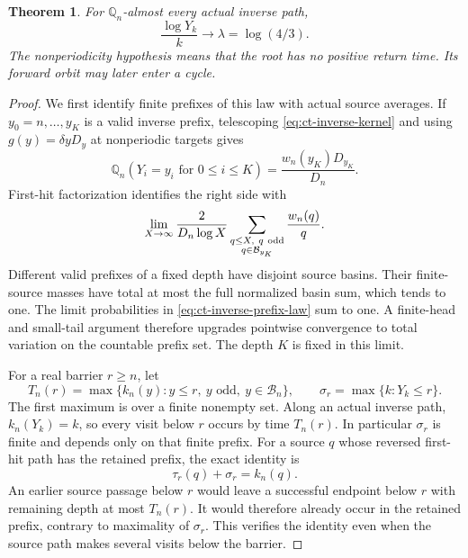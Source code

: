 \documentclass[11pt,a4paper]{article}
\newtheorem{theorem}{Theorem}
\begin{document}
\begin{theorem}\label{thm:ct-inverse-height-clock}
For \(\mathbb Q_n\)-almost every actual inverse path,
\begin{equation}\label{eq:ct-inverse-height-clock}
 \frac{\log Y_k}{k}\longrightarrow\lambda=\log(4/3).
\end{equation}
The nonperiodicity hypothesis means that the root has no positive
return time. Its forward orbit may later enter a cycle.
\end{theorem}
\begin{proof}
We first identify finite prefixes of this law with actual source
averages. If \(y_0=n,\ldots,y_K\) is a valid inverse prefix,
telescoping \eqref{eq:ct-inverse-kernel} and using
\(g(y)=\delta yD_y\) at nonperiodic targets gives
\begin{equation}\label{eq:ct-inverse-prefix-law}
 \mathbb Q_n(Y_i=y_i\text{ for }0\le i\le K)
       =\frac{w_n(y_K)D_{y_K}}{D_n}.
\end{equation}
First-hit factorization identifies the right side with
\[
 \lim_{X\to\infty}\frac2{D_n\log X}
       \sum_{\substack{q\le X,\ q\ {\rm odd}\\q\in\mathcal B_{y_K}}}
                          \frac{w_n(q)}q.
\]
Different valid prefixes of a fixed depth have disjoint source basins.
Their finite-source masses have total at most the full normalized
basin sum, which tends to one. The limit probabilities in
\eqref{eq:ct-inverse-prefix-law} sum to one. A finite-head and
small-tail argument therefore upgrades pointwise convergence to
total variation on the countable prefix set. The depth \(K\) is
fixed in this limit.

For a real barrier \(r\ge n\), let
\[
 T_n(r)=\max\{k_n(y):y\le r,\ y\text{ odd},\ y\in\mathcal B_n\},
 \qquad \sigma_r=\max\{k:Y_k\le r\}.
\]
The first maximum is over a finite nonempty set. Along an actual
inverse path, \(k_n(Y_k)=k\), so every visit below \(r\) occurs
by time \(T_n(r)\). In particular \(\sigma_r\) is finite and
depends only on that finite prefix. For a source \(q\) whose
reversed first-hit path has the retained prefix, the exact identity is
\begin{equation}\label{eq:ct-source-last-visit}
 \tau_r(q)+\sigma_r=k_n(q).
\end{equation}
An earlier source passage below \(r\) would leave a successful
endpoint below \(r\) with remaining depth at most \(T_n(r)\).
It would therefore already occur in the retained prefix, contrary
to maximality of \(\sigma_r\). This verifies the identity even
when the source path makes several visits below the barrier.


\end{proof}
\end{document}
